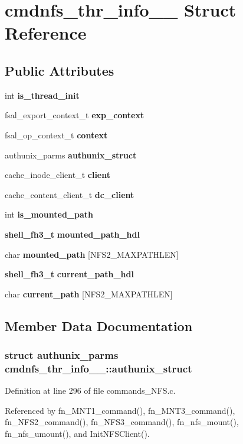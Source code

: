 \section{cmdnfs\_\-thr\_\-info\_\-\_\- Struct Reference}
\label{structcmdnfs__thr__info____}
\subsection*{Public Attributes}
\begin{CompactItemize}
\item 
int {\bf is\_\-thread\_\-init}
\item 
fsal\_\-export\_\-context\_\-t {\bf exp\_\-context}
\item 
fsal\_\-op\_\-context\_\-t {\bf context}
\item 
authunix\_\-parms {\bf authunix\_\-struct}
\item 
cache\_\-inode\_\-client\_\-t {\bf client}
\item 
cache\_\-content\_\-client\_\-t {\bf dc\_\-client}
\item 
int {\bf is\_\-mounted\_\-path}
\item 
{\bf shell\_\-fh3\_\-t} {\bf mounted\_\-path\_\-hdl}
\item 
char {\bf mounted\_\-path} [NFS2\_\-MAXPATHLEN]
\item 
{\bf shell\_\-fh3\_\-t} {\bf current\_\-path\_\-hdl}
\item 
char {\bf current\_\-path} [NFS2\_\-MAXPATHLEN]
\end{CompactItemize}


\subsection{Member Data Documentation}
\subsubsection{\setlength{\rightskip}{0pt plus 5cm}struct authunix\_\-parms {\bf cmdnfs\_\-thr\_\-info\_\-\_\-::authunix\_\-struct}}\label{structcmdnfs__thr__info_____o3}




Definition at line 296 of file commands\_\-NFS.c.

Referenced by fn\_\-MNT1\_\-command(), fn\_\-MNT3\_\-command(), fn\_\-NFS2\_\-command(), fn\_\-NFS3\_\-command(), fn\_\-nfs\_\-mount(), fn\_\-nfs\_\-umount(), and Init\-NFSClient().
